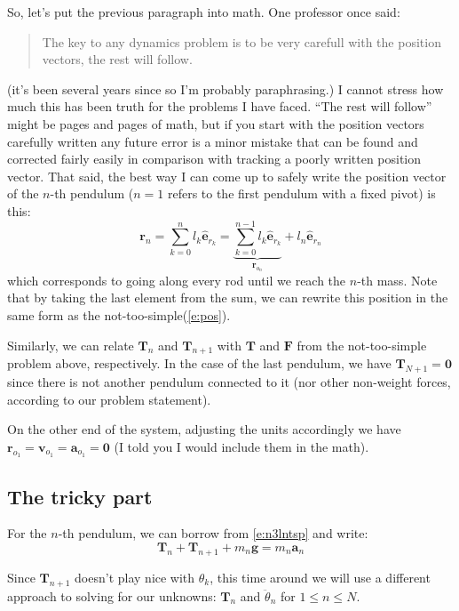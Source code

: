 \documentclass{article}
\newcommand{\vct}{\mathbf}     %
\newcommand{\uvc}[1]{\hat{\mathbf{#1}}} %
\newcommand{\erk}[1]{\uvc{e}_{r_{#1}}}      %
\newcommand{\nf}{F}              %
\newcommand{\vf}{\vct{\nf}}      %
\newcommand{\nt}{T}              %
\newcommand{\vt}{\vct{\nt}}      %
\newcommand{\vtk}[1]{\vct{\nt}_{#1}}      %
\newcommand{\vg}{\vct{g}}        %
\newcommand{\rok}[1]{\vct{r}_{o_{#1}}}    %
\newcommand{\vok}[1]{\vct{v}_{o_{#1}}}    %
\newcommand{\aok}[1]{\vct{a}_{o_{#1}}}    %
\newcommand{\vr}{\vct{r}}        %
\newcommand{\va}{\vct{a}}        %
\newcommand{\ntsp}{not-too-simple\xspace}
\begin{document}
So, let's put the previous paragraph into math. One professor once said: 
\begin{quote}
  The key to any dynamics problem is to be very carefull with the position vectors, the rest will follow.
\end{quote}
(it's been several years since so I'm probably paraphrasing.) I cannot stress how much this has been truth for the problems I have faced. ``The rest will follow'' might be pages and pages of math, but if you start with the position vectors carefully written any future error is a minor mistake that can be found and corrected fairly easily in comparison with tracking a poorly written position vector. That said, the best way I can come up to safely write the position vector of the $n$-th pendulum ($n=1$ refers to the first pendulum with a fixed pivot) is this:
\begin{equation}
  \vr_n=\sum_{k=0}^{n}l_k\erk{k}=\underbrace{\sum_{k=0}^{n-1}l_k\erk{k}}_{\rok{n}}+l_n\erk{n}
\end{equation}
which corresponds to going along every rod until we reach the $n$-th mass. Note that by taking the last element from the sum, we can rewrite this position in the same form as the \ntsp (\cref{e:pos}).

Similarly, we can relate $\vtk{n}$ and $\vtk{n+1}$ with $\vt$ and $\vf$ from the \ntsp problem above, respectively. In the case of the last pendulum, we have $\vtk{N+1}=\vct{0}$ since there is not another pendulum connected to it (nor other non-weight forces, according to our problem statement).

On the other end of the system, adjusting the units accordingly we have $\rok{1}=\vok{1}=\aok{1}=\vct{0}$ (I told you I would include them in the math).

\subsection{The tricky part}
For the $n$-th pendulum, we can borrow from \cref{e:n3lntsp} and write:
\begin{equation} 
 \vtk{n}+\vtk{n+1}+m_{n}\vg=m_{n}\va_{n} 
\end{equation}

Since $\vtk{n+1}$ doesn't play nice with $\theta_k$, this time around we will use a different approach to solving for our unknowns: $\vtk{n}$ and $\ddot{\theta}_n$ for $1\le n\le N$.
\end{document}
